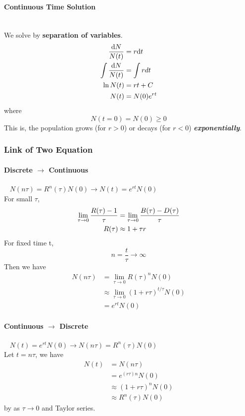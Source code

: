 \paragraph{Continuous Time Solution}~{}\\
We solve  by \textbf{separation of variables}.
\begin{align}
    \frac{\mathrm{d}N}{N(t)}      & =r\mathrm{d}t \notag \\
    \int \frac{\mathrm{d}N}{N(t)} & =\int r d t \notag   \\
    \ln N(t)                      & =rt+C\notag          \\
    N(t)                          & = N(0)e^{rt}
\end{align}
where
$$
    N(t=0)=N(0)\geq 0
$$
This is, the population grows (for $r>0$) or decays (for $r<0$) \emph{\textbf{exponentially}}.

\newpage

\subsubsection{Link of Two Equation}

\paragraph{Discrete $\rightarrow$ Continuous}~{
$
    N(n\tau) = R^n(\tau) N(0)  \rightarrow N(t) = e^{rt}N(0)
$}\\
For small $\tau$,
\begin{align}
    \lim _{\tau \rightarrow 0} \frac{R(\tau)-1}{\tau} & = \lim _{\tau \rightarrow 0}\frac{B(\tau)-D(\tau)}{\tau}\notag \\
    R(\tau)                                           & \approx 1+\tau r\label{eq1.6}
\end{align}
For fixed time t,
$$
    n=\frac{t}{\tau} \rightarrow \infty
$$
Then we have
\begin{align*}
    N(n \tau) & =\lim_{\tau \rightarrow 0}R(\tau)^nN(0)                      \\
              & \approx \lim _{\tau \rightarrow 0}(1+r \tau)^{t / \tau} N(0) \\
              & =e^{rt}N(0)
\end{align*}


\paragraph{Continuous $\rightarrow$ Discrete}~{
$
    N(t) = e^{rt}N(0) \rightarrow N(n\tau) = R^n(\tau) N(0)
$
}\\
Let $t=n\tau$, we have
\begin{align*}
    N(t) & =N(n\tau)                \\
         & =e^{(r\tau)n}N(0)        \\
         & \approx (1+r\tau)^n N(0) \\
         & \approx R^n(\tau)N(0)
\end{align*}
by  as $\tau \rightarrow 0$ and Taylor series.


